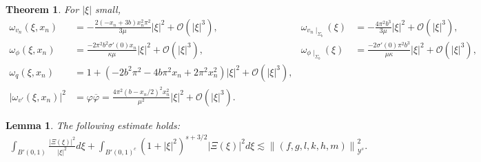 \documentclass[10pt,a4paper]{amsart}
\newtheorem{theorem}{Theorem}
\newtheorem{lemma}{Lemma}
\newcommand{\abs}[1]{\left\lvert#1\right\rvert}
\newcommand{\norm}[1]{\left\lVert#1\right\rVert}
\begin{document}
\begin{theorem} \label{lfasymp}
    For \(\abs{\xi}\) small,
    \begin{align}
        \omega_{v_{n}}(\xi,x_{n})&=-\frac{2(-x_{n}+3b)x_{n}^{2}\pi^{2}}{3\mu}\abs{\xi}^{2}+\mathcal{O}(\abs{\xi}^{3}), & 
        \omega_{v_{n}\mid_{\Sigma_{b}}}(\xi) &=-\frac{4\pi^{2}b^{3}}{3\mu}\abs{\xi}^{2}+\mathcal{O}(\abs{\xi}^{3}), \nonumber \\
        \omega_{\phi}(\xi,x_{n})&=\frac{-2\pi^{2}b^{2}\sigma'(0)x_{n}}{\kappa\mu}\abs{\xi}^{2}+\mathcal{O}(\abs{\xi}^{3}), & 
        \omega_{\phi\mid_{\Sigma_{b}}}(\xi)&=\frac{-2\sigma'(0)\pi^{2}b^{3}}{\mu\kappa}\abs{\xi}^{2}+\mathcal{O}(\abs{\xi}^{3}), \nonumber\\
        \omega_{q}(\xi,x_{n})&=1+(-2b^{2}\pi^{2}-4b\pi^{2}x_{n}+2\pi^{2}x_{n}^{2})\abs{\xi}^{2}+\mathcal{O}(\abs{\xi}^{3}),  \nonumber \\
        \abs{\omega_{v'}(\xi,x_{n})}^{2}&=\varphi\overline{\varphi}=\frac{4\pi^{2}(b-x_{n}/2)^{2}x_{n}^{2}}{\mu^{2}}\abs{\xi}^{2}+\mathcal{O}(\abs{\xi}^{3}) \label{vntrlow}.
\end{align}
\end{theorem}

\begin{lemma} \label{xiintestimate}
The following estimate holds:
    \begin{align}
        \int_{B'(0,1)}\frac{\abs{\Xi(\xi)}^{2}}{\abs{\xi}^{2}}d\xi+\int_{B'(0,1)^{c}}(1+\abs{\xi}^{2})^{s+3/2}\abs{\Xi(\xi)}^{2}d\xi\lesssim \norm{(f,g,l,k,h,m)}_{\mathcal{Y}^{s}}^{2}.
    \end{align}
\end{lemma}
\end{document}
